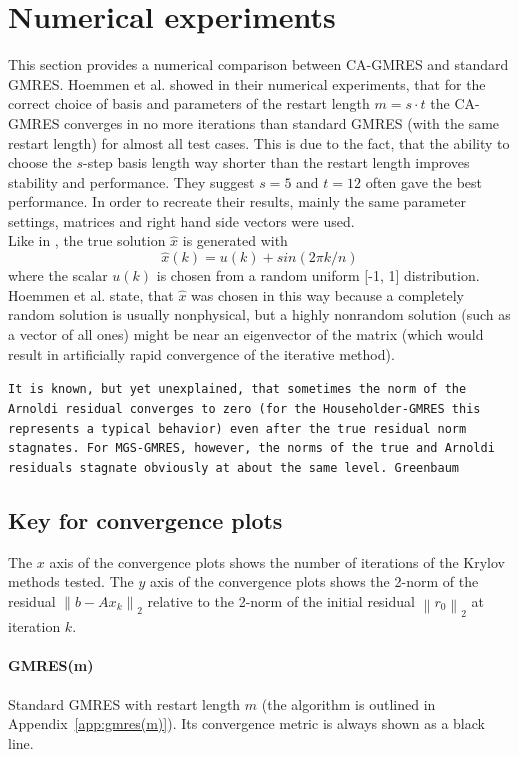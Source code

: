 \documentclass{scrartcl}
\numberwithin{equation}{section}
\newcommand{\norm}[1]{\left\lVert#1\right\rVert}
\begin{document}
\section{Numerical experiments}
This section provides a numerical comparison between CA-GMRES and standard GMRES. Hoemmen et al. \cite{Hoemmen:2010:CKS:1970638} showed in their numerical experiments, that for the correct choice of basis and parameters of the restart length $m = s \cdot t$ the CA-GMRES converges in no more iterations than standard GMRES (with the same restart length) for almost all test cases. This is due to the fact, that the ability to choose the $s$-step basis length way shorter than the restart length improves stability and performance. They suggest $s = 5$ and $t = 12$ often gave the best performance. In order to recreate their results, mainly the same parameter settings, matrices and right hand side vectors were used.\\

Like in \cite{Hoemmen:2010:CKS:1970638}, the true solution $\hat{x}$ is generated with
\begin{equation}
	\hat{x}(k) = u(k) + sin(2\pi k/n)
\end{equation}
where the scalar $u(k)$ is chosen from a random uniform [-1, 1] distribution. 
Hoemmen et al. state, that $\hat{x}$ was chosen in this way because a completely random solution is usually nonphysical, but a highly nonrandom solution (such as a vector of all ones) might be near an eigenvector of the matrix (which would result in artificially rapid convergence of the iterative method).

\texttt{It is known, but yet unexplained, that sometimes the norm of the Arnoldi residual converges to zero (for the Householder-GMRES this represents a typical behavior) even after the true residual norm stagnates. For MGS-GMRES, however, the norms of the true and Arnoldi residuals stagnate obviously at about the same level. Greenbaum~\cite{Greenbaum97numericalbehaviour}}

\subsection{Key for convergence plots}
The $x$ axis of the convergence plots shows the number of iterations of the Krylov methods tested. The $y$ axis of the convergence plots shows the 2-norm of the residual $\norm{b - Ax_k}_2$ relative to the 2-norm of the initial residual $\norm{r_0}_2$ at iteration $k$.
\paragraph{GMRES(m)} Standard GMRES with restart length $m$ (the algorithm is outlined in Appendix~\ref{app:gmres(m)}). Its convergence metric is always shown as a black line.
\end{document}
